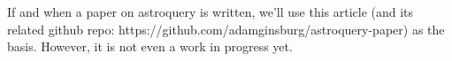 If and when a paper on astroquery is written, we'll use this article (and its related github repo: https://github.com/adamginsburg/astroquery-paper) as the basis.  However, it is not even a work in progress yet.